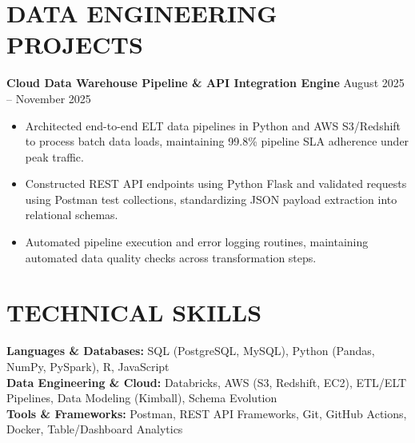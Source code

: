 \documentclass[11pt,letterpaper]{article}
\begin{document}
\section*{DATA ENGINEERING PROJECTS}
\noindent\small \textbf{Cloud Data Warehouse Pipeline \& API Integration Engine} \hfill August 2025 -- November 2025
\begin{itemize}
\item Architected end-to-end ELT data pipelines in Python and AWS S3/Redshift to process batch data loads, maintaining 99.8\% pipeline SLA adherence under peak traffic.
\item Constructed REST API endpoints using Python Flask and validated requests using Postman test collections, standardizing JSON payload extraction into relational schemas.
\item Automated pipeline execution and error logging routines, maintaining automated data quality checks across transformation steps.
\end{itemize}
\section*{TECHNICAL SKILLS}
\noindent\small \textbf{Languages \& Databases:} SQL (PostgreSQL, MySQL), Python (Pandas, NumPy, PySpark), R, JavaScript \\
\textbf{Data Engineering \& Cloud:} Databricks, AWS (S3, Redshift, EC2), ETL/ELT Pipelines, Data Modeling (Kimball), Schema Evolution \\
\textbf{Tools \& Frameworks:} Postman, REST API Frameworks, Git, GitHub Actions, Docker, Table/Dashboard Analytics
\end{document}
